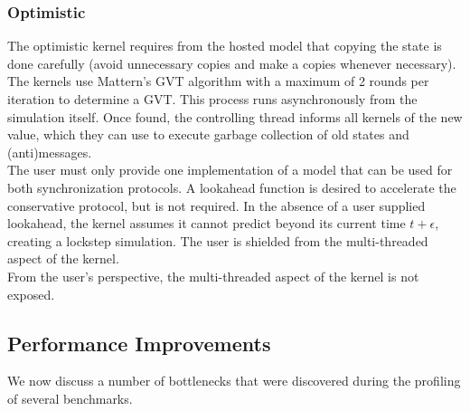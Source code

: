\subsubsection{Optimistic}
The optimistic kernel requires from the hosted model that copying the state is done carefully (avoid unnecessary copies and make a copies whenever necessary).\\
The kernels use Mattern's \cite{mattern}
GVT algorithm with a maximum of 2 rounds per iteration to determine a GVT. This process runs asynchronously from the simulation itself. Once found, the controlling thread informs all kernels of the new value, which they can use to execute garbage collection of old states and (anti)messages.\\
The user must only provide one implementation of a model that can be used for both synchronization protocols. A lookahead function is desired to accelerate the conservative protocol, but is not required. In the absence of a user supplied lookahead, the kernel assumes it cannot predict beyond its current time $t+\epsilon$, creating a lockstep simulation. %
The user is shielded from the multi-threaded aspect of the kernel.\\
From the user's perspective, the multi-threaded aspect of the kernel is not exposed. %

\subsection{Performance Improvements}
We now discuss a number of bottlenecks that were discovered during the profiling of several benchmarks.
